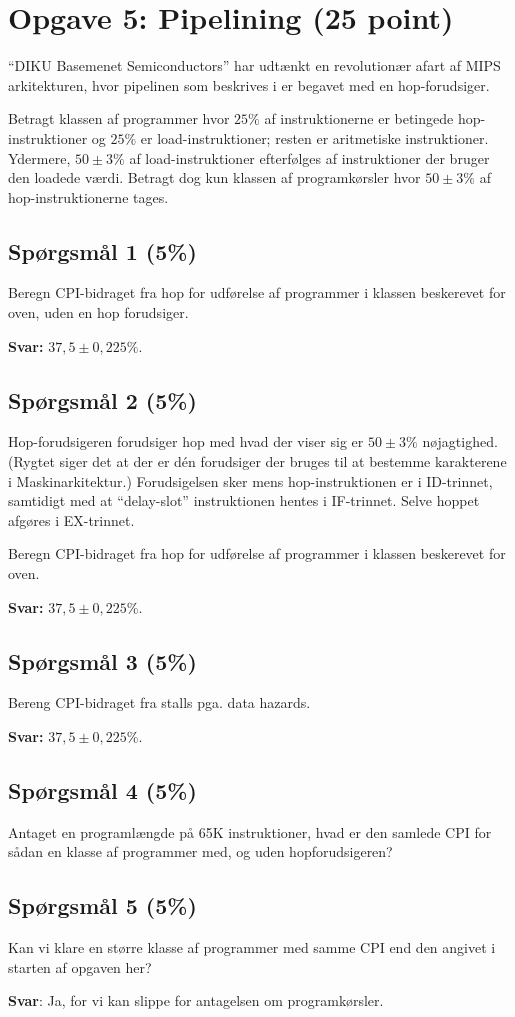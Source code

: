 \section*{Opgave 5: Pipelining (25 point)}

``DIKU Basemenet Semiconductors'' har udtænkt en revolutionær afart af MIPS
arkitekturen, hvor pipelinen som beskrives i \cite{cod5e} er begavet med en
hop-forudsiger.

Betragt klassen af programmer hvor $25\%$ af instruktionerne er betingede
hop-instruktioner og $25\%$ er load-instruktioner; resten er aritmetiske
instruktioner. Ydermere, $50\pm 3\%$ af load-instruktioner efterfølges af
instruktioner der bruger den loadede værdi. Betragt dog kun klassen af
programkørsler hvor $50 \pm 3\%$ af hop-instruktionerne tages.

\subsection*{Spørgsmål 1 (5\%)}

Beregn CPI-bidraget fra hop for udførelse af programmer i klassen beskerevet
for oven, uden en hop forudsiger.

\textbf{Svar:} $37,5 \pm 0,225\%$.

\subsection*{Spørgsmål 2 (5\%)}

Hop-forudsigeren forudsiger hop med hvad der viser sig er $50 \pm 3\%$
nøjagtighed.  (Rygtet siger det at der er dén forudsiger der bruges til at
bestemme karakterene i Maskinarkitektur.) Forudsigelsen sker mens
hop-instruktionen er i ID-trinnet, samtidigt med at ``delay-slot''
instruktionen hentes i IF-trinnet. Selve hoppet afgøres i EX-trinnet.

Beregn CPI-bidraget fra hop for udførelse af programmer i klassen beskerevet
for oven.

\textbf{Svar:} $37,5 \pm 0,225\%$.

\subsection*{Spørgsmål 3 (5\%)}

Bereng CPI-bidraget fra stalls pga. data hazards.

\textbf{Svar:} $37,5 \pm 0,225\%$.

\subsection*{Spørgsmål 4 (5\%)}

Antaget en programlængde på 65K instruktioner, hvad er den samlede CPI for
sådan en klasse af programmer med, og uden hopforudsigeren?

\subsection*{Spørgsmål 5 (5\%)}

Kan vi klare en større klasse af programmer med samme CPI end den angivet i
starten af opgaven her?

\textbf{Svar}: Ja, for vi kan slippe for antagelsen om programkørsler.
